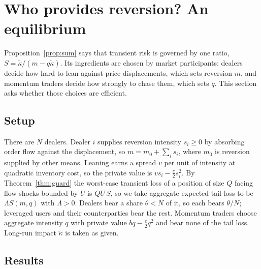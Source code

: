 \section{Who provides reversion? An equilibrium}\label{sec:equil}

Proposition~\ref{prop:sum} says that transient risk is governed by one ratio, $S=\tilde\kappa/(m-q\tilde\kappa)$. Its ingredients are chosen by market participants: dealers decide how hard to lean against price displacements, which sets reversion $m$, and momentum traders decide how strongly to chase them, which sets $q$. This section asks whether those choices are efficient.

\subsection{Setup}
There are $N$ dealers. Dealer $i$ supplies reversion intensity $s_i\ge0$ by absorbing order flow against the displacement, so $m=m_0+\sum_is_i$, where $m_0$ is reversion supplied by other means. Leaning earns a spread $v$ per unit of intensity at quadratic inventory cost, so the private value is $vs_i-\tfrac c2s_i^2$. By Theorem~\ref{thm:guard} the worst-case transient loss of a position of size $Q$ facing flow shocks bounded by $U$ is $QU\,S$, so we take aggregate expected tail loss to be $\Lambda S(m,q)$ with $\Lambda>0$. Dealers bear a share $\theta<N$ of it, so each bears $\theta/N$; leveraged users and their counterparties bear the rest. Momentum traders choose aggregate intensity $q$ with private value $bq-\tfrac e2q^2$ and bear none of the tail loss. Long-run impact $\tilde\kappa$ is taken as given.

\subsection{Results}

